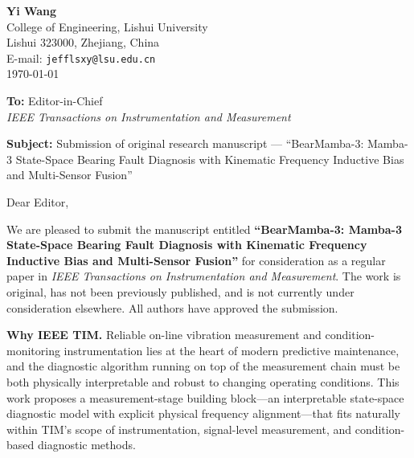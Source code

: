 \documentclass[11pt,a4paper]{article}
\begin{document}
\thispagestyle{empty}

\textbf{Yi Wang}\\
College of Engineering, Lishui University\\
Lishui 323000, Zhejiang, China\\
E-mail: \texttt{jefflsxy@lsu.edu.cn}\\[6pt]
\today

\vspace{12pt}

\textbf{To:} Editor-in-Chief\\
\textit{IEEE Transactions on Instrumentation and Measurement}

\vspace{12pt}

\textbf{Subject:} Submission of original research manuscript ---
``BearMamba-3: Mamba-3 State-Space Bearing Fault Diagnosis with Kinematic
Frequency Inductive Bias and Multi-Sensor Fusion''

\vspace{6pt}

Dear Editor,

We are pleased to submit the manuscript entitled \textbf{``BearMamba-3:
Mamba-3 State-Space Bearing Fault Diagnosis with Kinematic Frequency
Inductive Bias and Multi-Sensor Fusion''} for consideration as a regular
paper in \textit{IEEE Transactions on Instrumentation and Measurement}.
The work is original, has not been previously published, and is not
currently under consideration elsewhere. All authors have approved the
submission.

\textbf{Why IEEE TIM.} Reliable on-line vibration measurement and
condition-monitoring instrumentation lies at the heart of modern
predictive maintenance, and the diagnostic algorithm running on top of
the measurement chain must be both physically interpretable and robust
to changing operating conditions. This work proposes a measurement-stage
building block---an interpretable state-space diagnostic model with
explicit physical frequency alignment---that fits naturally within TIM's
scope of instrumentation, signal-level measurement, and condition-based
diagnostic methods.
\end{document}
